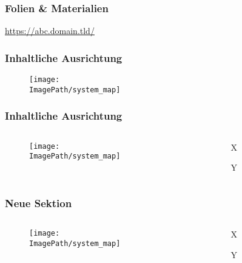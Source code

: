\newcommand*{\TemplatePath}{../../../template/slides}
\newcommand*{\SourcesPath}{../../../sources}
\newcommand*{\ImagePath}{../../../images}


\subtitle{Kapitel 1: Einführung}
   


\frame{\titlepage}


\begin{frame}
	\frametitle{Folien \& Materialien}

	\begin{center}
		\url{https://abc.domain.tld/}
	\end{center}
\end{frame}


\begin{frame}
	\frametitle{Inhaltliche Ausrichtung}

	\begin{figure}
		\centering
		\texttt{[image: \\ImagePath/system\_map]}
	\end{figure}
\end{frame}

\begin{frame}
	\frametitle{Inhaltliche Ausrichtung}
	\begin{columns}
		\begin{column}{0.5\textwidth}
			\begin{figure}
				\centering
				\texttt{[image: \\ImagePath/system\_map]}
			\end{figure}
		\end{column}
		\begin{column}{0.5\textwidth}
			\begin{hints}
				\item X
				\item Y
			\end{hints}
		\end{column}
	\end{columns}
\end{frame}



\begin{frame}
	\frametitle{Neue Sektion}
	\begin{columns}
		\begin{column}{0.5\textwidth}
			\begin{figure}
				\centering
				\texttt{[image: \\ImagePath/system\_map]}
			\end{figure}
		\end{column}
		\begin{column}{0.5\textwidth}
			\begin{steps}
				\item X
				\item Y
			\end{steps}
		\end{column}
	\end{columns}
\end{frame}

